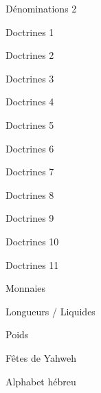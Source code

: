 \documentclass[11pt]{book}
\begin{document}
\begin{center}Dénominations 2\end{center}\clearpage
{}\clearpage
\begin{center}Doctrines 1\end{center}\clearpage
\begin{center}Doctrines 2\end{center}\clearpage
\begin{center}Doctrines 3\end{center}\clearpage
\begin{center}Doctrines 4\end{center}\clearpage
\begin{center}Doctrines 5\end{center}\clearpage
\begin{center}Doctrines 6\end{center}\clearpage
\begin{center}Doctrines 7\end{center}\clearpage
\begin{center}Doctrines 8\end{center}\clearpage
\begin{center}Doctrines 9\end{center}\clearpage
\begin{center}Doctrines 10\end{center}\clearpage
\begin{center}Doctrines 11\end{center}\clearpage
{}\clearpage
\begin{center}Monnaies\end{center}\clearpage
{}\clearpage
\begin{center}Longueurs / Liquides\end{center}\clearpage
{}\clearpage
\begin{center}Poids\end{center}\clearpage
{}\clearpage
\begin{center}Fêtes de Yahweh\end{center}\clearpage
{}\clearpage
\begin{center}Alphabet hébreu\end{center}\clearpage
\end{document}
